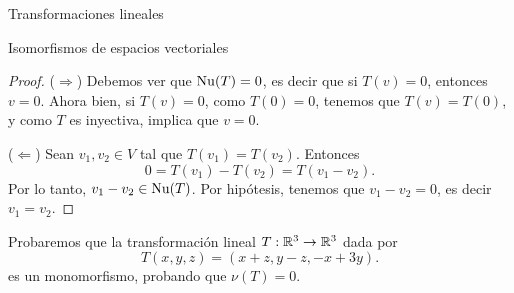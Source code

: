 \begin{chapter}{Transformaciones lineales}
\begin{section}{Isomorfismos de espacios vectoriales}
\begin{proof}
            ($\Rightarrow$) Debemos ver que  $\operatorname{Nu}(T)=0$,  es decir que si $T(v)=0$,  entonces  $v=0$. Ahora bien,  si $T(v) = 0$, como  $T(0)=0$, tenemos que $T(v)  = T(0)$, y como $T$ es inyectiva, implica que $v =0$.
            
            ($\Leftarrow$) Sean  $v_1,v_2 \in V$ tal que $T(v_1)=T(v_2)$. Entonces 
            $$
            0 = T(v_1)- T(v_2) = T(v_1 -v_2).
            $$
            Por  lo tanto, $v_1 -v_2 \in \operatorname{Nu}(T)$. Por hipótesis, tenemos que $v_1 -v_2 =0$,  es decir $v_1 = v_2$.
        \end{proof}
        
        \begin{ejemplo*}
            Probaremos que la transformación lineal $T: \mathbb R^3  \to \mathbb R^3$  dada por 
            $$
            T(x,y,z) = (x+z, y-z,-x +3y).
            $$
            es un monomorfismo, probando que $\nu(T)=0$.
            

\end{ejemplo*}
\end{section}
\end{chapter}
